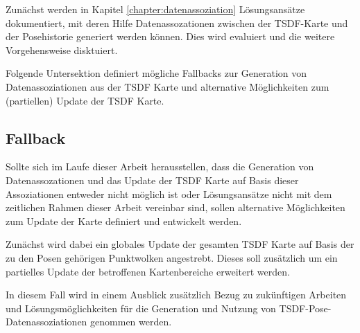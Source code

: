 Zunächst werden in Kapitel \ref{chapter:datenassoziation} Lösungsansätze dokumentiert, mit deren Hilfe Datenassozationen zwischen der TSDF-Karte und der Posehistorie generiert werden können. Dies wird evaluiert und die weitere Vorgehensweise disktuiert.

Folgende Untersektion definiert mögliche Fallbacks zur Generation von Datenassoziationen aus der TSDF Karte und alternative Möglichkeiten zum (partiellen) Update der TSDF Karte.

\subsection{Fallback}
\label{section:fallback}

Sollte sich im Laufe dieser Arbeit herausstellen, dass die Generation von Datenassozationen und das Update der TSDF Karte auf Basis dieser Assoziationen entweder nicht möglich ist oder Lösungsansätze nicht mit dem zeitlichen Rahmen dieser Arbeit vereinbar sind, sollen alternative Möglichkeiten zum Update der Karte definiert und entwickelt werden.

Zunächst wird dabei ein globales Update der gesamten TSDF Karte auf Basis der zu den Posen gehörigen Punktwolken angestrebt.
Dieses soll zusätzlich um ein partielles Update der betroffenen Kartenbereiche erweitert werden.

In diesem Fall wird in einem Ausblick zusätzlich Bezug zu zukünftigen Arbeiten und Lösungsmöglichkeiten für die Generation und Nutzung von TSDF-Pose-Datenassoziationen genommen werden.


